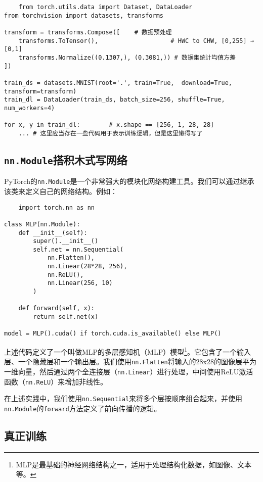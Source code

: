 \documentclass[../main.tex]{subfiles}
\begin{document}
\begin{lstlisting}
    from torch.utils.data import Dataset, DataLoader
from torchvision import datasets, transforms

transform = transforms.Compose([    # 数据预处理
    transforms.ToTensor(),                    # HWC to CHW, [0,255] → [0,1]
    transforms.Normalize((0.1307,), (0.3081,)) # 数据集统计均值方差
])

train_ds = datasets.MNIST(root='.', train=True,  download=True, transform=transform)
train_dl = DataLoader(train_ds, batch_size=256, shuffle=True, num_workers=4)

for x, y in train_dl:        # x.shape == [256, 1, 28, 28]
    ... # 这里应当存在一些代码用于表示训练逻辑，但是这里懒得写了
\end{lstlisting}

\subsection{\texttt{nn.Module}搭积木式写网络}

PyTorch的\texttt{nn.Module}是一个非常强大的模块化网络构建工具。我们可以通过继承该类来定义自己的网络结构。例如：

\begin{lstlisting}
    import torch.nn as nn

class MLP(nn.Module):
    def __init__(self):
        super().__init__()
        self.net = nn.Sequential(
            nn.Flatten(),
            nn.Linear(28*28, 256),
            nn.ReLU(),
            nn.Linear(256, 10)
        )

    def forward(self, x):
        return self.net(x)

model = MLP().cuda() if torch.cuda.is_available() else MLP()
\end{lstlisting}

上述代码定义了一个叫做MLP的多层感知机（MLP）模型\footnote{MLP是最基础的神经网络结构之一，适用于处理结构化数据，如图像、文本等。}。它包含了一个输入层、一个隐藏层和一个输出层。我们使用\texttt{nn.Flatten}将输入的28x28的图像展平为一维向量，然后通过两个全连接层（\texttt{nn.Linear}）进行处理，中间使用ReLU激活函数（\texttt{nn.ReLU}）来增加非线性。

在上述实践中，我们使用\texttt{nn.Sequential}来将多个层按顺序组合起来，并使用\texttt{nn.Module}的\texttt{forward}方法定义了前向传播的逻辑。

\subsection{真正训练}
\end{document}
